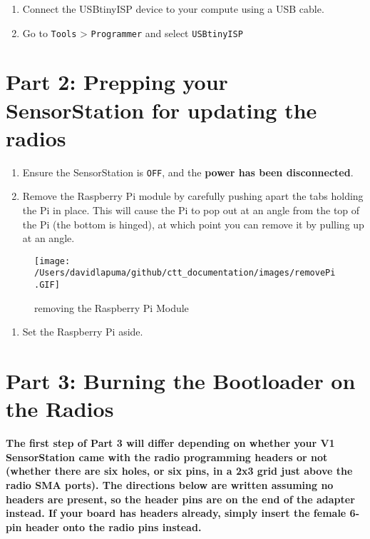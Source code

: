 \documentclass[
]{article}
\providecommand{\tightlist}{%
  \setlength{\itemsep}{0pt}\setlength{\parskip}{0pt}}
\begin{document}
\begin{enumerate}
\def\labelenumi{\arabic{enumi}.}
\setcounter{enumi}{5}
\item
  Connect the USBtinyISP device to your compute using a USB cable.
\item
  Go to \texttt{Tools} \textgreater{} \texttt{Programmer} and select
  \texttt{USBtinyISP}
\end{enumerate}

\hypertarget{part-2-prepping-your-sensorstation-for-updating-the-radios}{%
\section{Part 2: Prepping your SensorStation for updating the
radios}\label{part-2-prepping-your-sensorstation-for-updating-the-radios}}

\begin{enumerate}
\def\labelenumi{\arabic{enumi}.}
\tightlist
\item
  Ensure the SensorStation is \texttt{OFF}, and the \textbf{power has
  been disconnected}.
\item
  Remove the Raspberry Pi module by carefully pushing apart the tabs
  holding the Pi in place. This will cause the Pi to pop out at an angle
  from the top of the Pi (the bottom is hinged), at which point you can
  remove it by pulling up at an angle.
\end{enumerate}

\begin{figure}
\hypertarget{id}{%
\centering
\texttt{[image: /Users/davidlapuma/github/ctt\_documentation/images/removePi.GIF]}
\caption{removing the Raspberry Pi Module}\label{id}
}
\end{figure}

\begin{enumerate}
\def\labelenumi{\arabic{enumi}.}
\setcounter{enumi}{2}
\tightlist
\item
  Set the Raspberry Pi aside.
\end{enumerate}

\hypertarget{part-3-burning-the-bootloader-on-the-radios}{%
\section{Part 3: Burning the Bootloader on the
Radios}\label{part-3-burning-the-bootloader-on-the-radios}}

\textbf{The first step of Part 3 will differ depending on whether your
V1 SensorStation came with the radio programming headers or not (whether
there are six holes, or six pins, in a 2x3 grid just above the radio SMA
ports). The directions below are written assuming no headers are
present, so the header pins are on the end of the adapter instead. If
your board has headers already, simply insert the female 6-pin header
onto the radio pins instead.}
\end{document}

